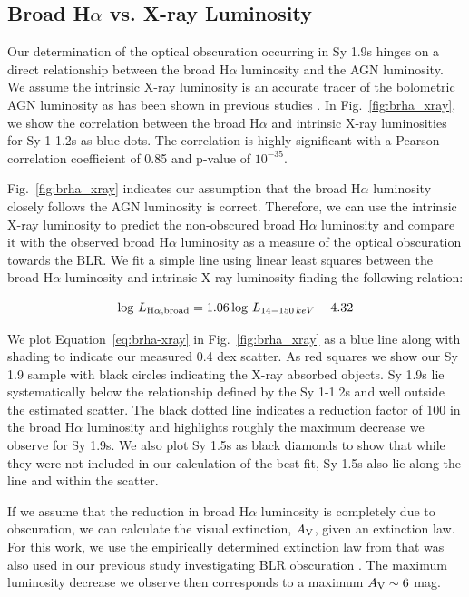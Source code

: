 \documentclass[twocolumn,trackchanges]{aastex6}
\newcommand{\halpha}{H$\alpha$}
\begin{document}
\subsection{Broad \halpha{} vs. X-ray Luminosity}
Our determination of the optical obscuration occurring in Sy 1.9s hinges on a direct relationship between the broad \halpha{} luminosity and the AGN luminosity. We assume the intrinsic X-ray luminosity is an accurate tracer of the bolometric AGN luminosity as has been shown in previous studies \citep[e.g.][]{Winter:2012yq}. In Fig.~\ref{fig:brha_xray}, we show the correlation between the broad \halpha{} and intrinsic X-ray luminosities for Sy 1-1.2s as blue dots. The correlation is highly significant with a Pearson correlation coefficient of 0.85 and p-value of $10^{-35}$. 

Fig.~\ref{fig:brha_xray} indicates our assumption that the broad \halpha{} luminosity closely follows the AGN luminosity is correct. Therefore, we can use the intrinsic X-ray luminosity to predict the non-obscured broad \halpha{} luminosity and compare it with the observed broad \halpha{} luminosity as a measure of the optical obscuration towards the BLR. We fit a simple line using linear least squares between the broad \halpha{} luminosity and intrinsic X-ray luminosity finding the following relation:

\begin{equation}\label{eq:brha-xray}
\log\,L_{\rm H\alpha, broad} = 1.06\log\,L_{14-150\,keV} - 4.32
\end{equation}

We plot Equation~\ref{eq:brha-xray} in Fig.~\ref{fig:brha_xray} as a blue line along with shading to indicate our measured 0.4 dex scatter. As red squares we show our Sy 1.9 sample with black circles indicating the X-ray absorbed objects. Sy 1.9s lie systematically below the relationship defined by the Sy 1-1.2s and well outside the estimated scatter. The black dotted line indicates a reduction factor of 100 in the broad \halpha{} luminosity and highlights roughly the maximum decrease we observe for Sy 1.9s. We also plot Sy 1.5s as black diamonds to show that while they were not included in our calculation of the best fit, Sy 1.5s also lie along the line and within the scatter.

If we assume that the reduction in broad \halpha{} luminosity is completely due to obscuration, we can calculate the visual extinction, $A_{\rm V}$, given an extinction law. For this work, we use the empirically determined extinction law from \citet{Wild:2011aa} that was also used in our previous study investigating BLR obscuration \citep{Schnorr-Muller:2016qy}.  The maximum luminosity decrease we observe then corresponds to a maximum $A_{\rm V}\sim6$ mag. 
\end{document}
